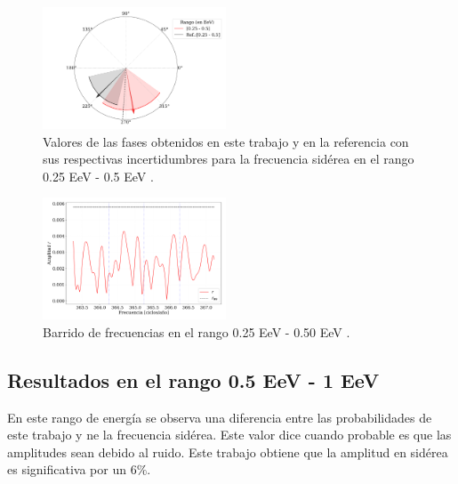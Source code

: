 \begin{figure}[H]
    \begin{small}
        \begin{center}
            \includegraphics[width=0.485\textwidth]{phase_primer_bin.pdf}
        \end{center}
        \caption{Valores de las fases obtenidos en este trabajo y en la referencia con sus respectivas incertidumbres para la frecuencia sidérea en el  rango 0.25 EeV - 0.5 EeV .}
        \label{fig:primer}
    \end{small}
\end{figure}

\begin{figure}[H]
    \begin{small}
        \begin{center}
            \includegraphics[width=0.485\textwidth]{plot_bin_1_barrido_v2.pdf}
        \end{center}
        \caption{Barrido de frecuencias en el  rango 0.25 EeV - 0.50 EeV .}
        \label{fig:primer_barrido}
    \end{small}
\end{figure}

\subsection*{Resultados en el rango 0.5 EeV - 1 EeV}
En este rango de energía se observa una diferencia entre las probabilidades de este trabajo y \cite{Aab_2020}  ne la frecuencia sidérea. Este valor dice cuando probable es que las amplitudes sean debido al ruido. Este trabajo obtiene que la amplitud en sidérea es significativa por un  $6\%$.  

